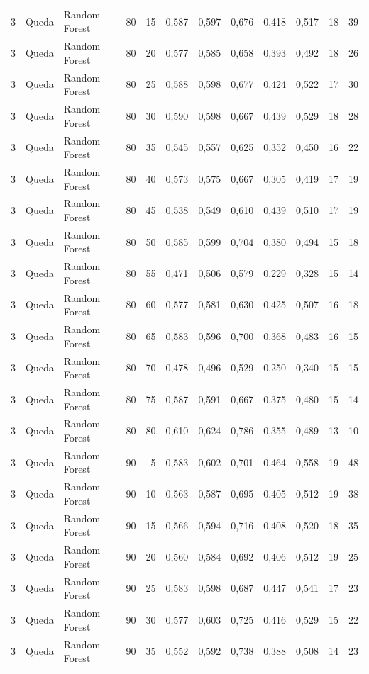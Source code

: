 \begin{longtable}{@{}rllrrrrrrrrr@{}}
3 & Queda & Random Forest & 80 & 15 & 0,587 & 0,597 & 0,676 & 0,418 & 0,517 & 18 & 39 \\
3 & Queda & Random Forest & 80 & 20 & 0,577 & 0,585 & 0,658 & 0,393 & 0,492 & 18 & 26 \\
3 & Queda & Random Forest & 80 & 25 & 0,588 & 0,598 & 0,677 & 0,424 & 0,522 & 17 & 30 \\
3 & Queda & Random Forest & 80 & 30 & 0,590 & 0,598 & 0,667 & 0,439 & 0,529 & 18 & 28 \\
3 & Queda & Random Forest & 80 & 35 & 0,545 & 0,557 & 0,625 & 0,352 & 0,450 & 16 & 22 \\
3 & Queda & Random Forest & 80 & 40 & 0,573 & 0,575 & 0,667 & 0,305 & 0,419 & 17 & 19 \\
3 & Queda & Random Forest & 80 & 45 & 0,538 & 0,549 & 0,610 & 0,439 & 0,510 & 17 & 19 \\
3 & Queda & Random Forest & 80 & 50 & 0,585 & 0,599 & 0,704 & 0,380 & 0,494 & 15 & 18 \\
3 & Queda & Random Forest & 80 & 55 & 0,471 & 0,506 & 0,579 & 0,229 & 0,328 & 15 & 14 \\
3 & Queda & Random Forest & 80 & 60 & 0,577 & 0,581 & 0,630 & 0,425 & 0,507 & 16 & 18 \\
3 & Queda & Random Forest & 80 & 65 & 0,583 & 0,596 & 0,700 & 0,368 & 0,483 & 16 & 15 \\
3 & Queda & Random Forest & 80 & 70 & 0,478 & 0,496 & 0,529 & 0,250 & 0,340 & 15 & 15 \\
3 & Queda & Random Forest & 80 & 75 & 0,587 & 0,591 & 0,667 & 0,375 & 0,480 & 15 & 14 \\
3 & Queda & Random Forest & 80 & 80 & 0,610 & 0,624 & 0,786 & 0,355 & 0,489 & 13 & 10 \\
3 & Queda & Random Forest & 90 & 5 & 0,583 & 0,602 & 0,701 & 0,464 & 0,558 & 19 & 48 \\
3 & Queda & Random Forest & 90 & 10 & 0,563 & 0,587 & 0,695 & 0,405 & 0,512 & 19 & 38 \\
3 & Queda & Random Forest & 90 & 15 & 0,566 & 0,594 & 0,716 & 0,408 & 0,520 & 18 & 35 \\
3 & Queda & Random Forest & 90 & 20 & 0,560 & 0,584 & 0,692 & 0,406 & 0,512 & 19 & 25 \\
3 & Queda & Random Forest & 90 & 25 & 0,583 & 0,598 & 0,687 & 0,447 & 0,541 & 17 & 23 \\
3 & Queda & Random Forest & 90 & 30 & 0,577 & 0,603 & 0,725 & 0,416 & 0,529 & 15 & 22 \\
3 & Queda & Random Forest & 90 & 35 & 0,552 & 0,592 & 0,738 & 0,388 & 0,508 & 14 & 23 \\

\end{longtable}
